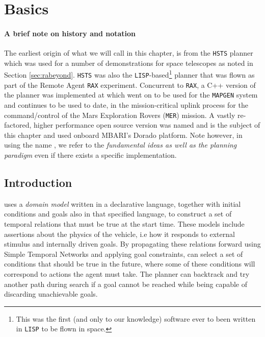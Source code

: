 \section{\eu Basics}
\label{sec:basics}

\paragraph {A brief note on \eu history and notation} The earliest
origin of what we will call \eu in this chapter, is from the
\texttt{HSTS} planner \cite{mus94} which was used for a number of
demonstrations for space telescopes as noted in Section
\ref{sec:rabeyond}. \texttt{HSTS} was also the
\texttt{LISP}-based\footnote{This was the first (and only to our
  knowledge) software ever to been written in \texttt{LISP} to be
  flown in space.} planner that was flown as part of the Remote Agent
\texttt{RAX} experiment. Concurrent to \texttt{RAX}, a C++ version of
the planner was implemented at which went on to be used for the
\texttt{MAPGEN} \cite{bresina05} system and continues to be used to
date, in the mission-critical uplink process for the command/control
of the Mars Exploration Rovers (\texttt{MER}) mission. A vastly
re-factored, higher performance open source version \cite{europapso}
was named \eut and is the subject of this chapter and used onboard
MBARI's Dorado platform. Note however, in using the name \eu, we refer
to the \emph{fundamental ideas as well as the planning paradigm} even
if there exists a specific implementation.

\subsection{Introduction}
\label{sec:euintro}

\eu uses a \emph{domain model} written in a declarative language,
together with initial conditions and goals also in that specified
language, to construct a set of temporal relations that must be true
at the start time. These models include assertions about the physics
of the vehicle, i.e how it responds to external stimulus and
internally driven goals. By propagating these relations forward using
Simple Temporal Networks \cite{dechter91} and applying goal
constraints, \eu can select a set of conditions that should be true in
the future, where some of these conditions will correspond to actions
the agent must take. The planner can backtrack and try another path
during search if a goal cannot be reached while being capable of
discarding unachievable goals.

